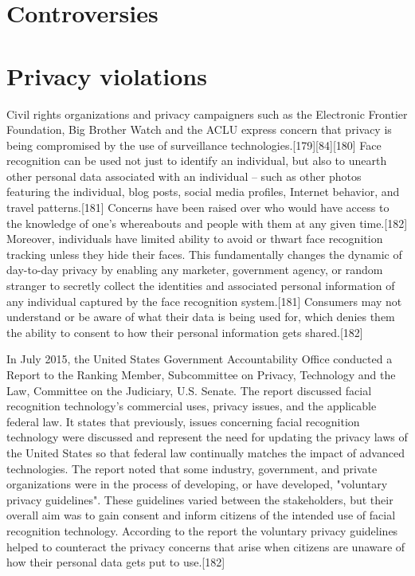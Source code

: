 \section{Controversies}
\section{Privacy violations}
Civil rights organizations and privacy campaigners such as the Electronic Frontier Foundation, Big Brother Watch and the ACLU express concern that privacy is being compromised by the use of surveillance technologies.[179][84][180] Face recognition can be used not just to identify an individual, but also to unearth other personal data associated with an individual – such as other photos featuring the individual, blog posts, social media profiles, Internet behavior, and travel patterns.[181] Concerns have been raised over who would have access to the knowledge of one's whereabouts and people with them at any given time.[182] Moreover, individuals have limited ability to avoid or thwart face recognition tracking unless they hide their faces. This fundamentally changes the dynamic of day-to-day privacy by enabling any marketer, government agency, or random stranger to secretly collect the identities and associated personal information of any individual captured by the face recognition system.[181] Consumers may not understand or be aware of what their data is being used for, which denies them the ability to consent to how their personal information gets shared.[182]

In July 2015, the United States Government Accountability Office conducted a Report to the Ranking Member, Subcommittee on Privacy, Technology and the Law, Committee on the Judiciary, U.S. Senate. The report discussed facial recognition technology's commercial uses, privacy issues, and the applicable federal law. It states that previously, issues concerning facial recognition technology were discussed and represent the need for updating the privacy laws of the United States so that federal law continually matches the impact of advanced technologies. The report noted that some industry, government, and private organizations were in the process of developing, or have developed, "voluntary privacy guidelines". These guidelines varied between the stakeholders, but their overall aim was to gain consent and inform citizens of the intended use of facial recognition technology. According to the report the voluntary privacy guidelines helped to counteract the privacy concerns that arise when citizens are unaware of how their personal data gets put to use.[182]


